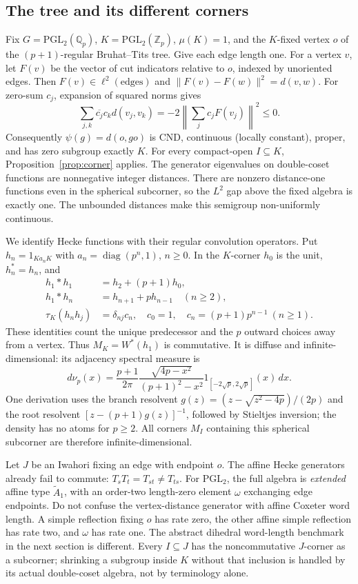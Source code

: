 \documentclass[11pt]{article}
\theoremstyle{remark}\newtheorem{remark}[definition]{Remark}
\newcommand{\Q}{\mathbb{Q}}
\newcommand{\Z}{\mathbb{Z}}
\begin{document}
\subsection{The tree and its different corners}
Fix $G=\mathrm{PGL}_2(\Q_p)$, $K=\mathrm{PGL}_2(\Z_p)$,
$\mu(K)=1$, and the $K$-fixed vertex $o$ of the $(p+1)$-regular
Bruhat--Tits tree. Give each edge length one. For a vertex $v$, let $F(v)$
be the vector of cut indicators relative to $o$, indexed by unoriented edges.
Then $F(v)\in\ell^2(\text{edges})$ and
$\|F(v)-F(w)\|^2=d(v,w)$. For zero-sum $c_j$, expansion of squared
norms gives
\[
 \sum_{j,k}\overline{c_j}c_k d(v_j,v_k)
 =-2\left\|\sum_jc_jF(v_j)\right\|^2\leq0.
\]
Consequently $\psi(g)=d(o,go)$ is CND, continuous (locally constant),
proper, and has zero subgroup exactly $K$.
For every compact-open $I\subseteq K$, Proposition~\ref{prop:corner} applies.
The generator eigenvalues on double-coset functions are nonnegative
integer distances. There are nonzero distance-one functions even in the
spherical subcorner, so the $L^2$ gap above the fixed algebra is exactly
one. The unbounded distances make this semigroup non-uniformly continuous.

We identify Hecke functions with their regular convolution operators.
Put $h_n=1_{Ka_nK}$ with $a_n=\operatorname{diag}(p^n,1)$, $n\geq0$.
In the $K$-corner $h_0$ is the unit, $h_n^*=h_n$, and
\begin{align}
 h_1*h_1&=h_2+(p+1)h_0,\label{eq:radial1}\\
 h_1*h_n&=h_{n+1}+p h_{n-1}\quad(n\geq2),\label{eq:radial2}\\
 \tau_K(h_n h_j)&=\delta_{nj}c_n,
 \quad c_0=1,\quad c_n=(p+1)p^{n-1}\ (n\geq1).\label{eq:moments}
\end{align}
These identities count the unique predecessor and the $p$ outward choices
away from a vertex. Thus $M_K=W^*(h_1)$ is commutative. It is diffuse and
infinite-dimensional: its adjacency spectral measure is
\[
 d\nu_p(x)=\frac{p+1}{2\pi}
 \frac{\sqrt{4p-x^2}}{(p+1)^2-x^2}
 1_{[-2\sqrt p,2\sqrt p]}(x)\,dx.
\]
One derivation uses the branch resolvent
$g(z)=(z-\sqrt{z^2-4p})/(2p)$ and the root resolvent
$[z-(p+1)g(z)]^{-1}$, followed by Stieltjes inversion; the density has
no atoms for $p\geq2$. All corners $M_I$ containing this spherical
subcorner are therefore infinite-dimensional.

Let $J$ be an Iwahori fixing an edge with endpoint $o$. The affine
Hecke generators already fail to commute: $T_sT_t=T_{st}\ne T_{ts}$.
For $\mathrm{PGL}_2$, the full algebra is \emph{extended} affine type
$\widetilde A_1$, with an order-two length-zero element $\omega$ exchanging
edge endpoints. Do not confuse the vertex-distance generator with affine
Coxeter word length. A simple reflection fixing $o$ has rate zero, the
other affine simple reflection has rate two, and $\omega$ has rate one.
The abstract dihedral word-length benchmark in the next section is different.
Every $I\subseteq J$ has the noncommutative $J$-corner as a subcorner;
shrinking a subgroup inside $K$ without that inclusion is handled by its
actual double-coset algebra, not by terminology alone.
\end{document}

